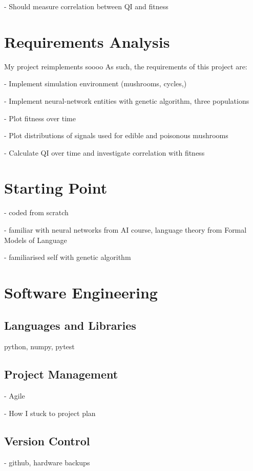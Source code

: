 \documentclass[12pt,a4paper,twoside,openright]{report}
\begin{document}
- Should measure correlation between QI and fitness

\section{Requirements Analysis}

My project reimplements \citet{Cangelosi1998} soooo
As such, the requirements of this project are:

- Implement simulation environment (mushrooms, cycles,)

- Implement neural-network entities with genetic algorithm, three populations

- Plot fitness over time

- Plot distributions of signals used for edible and poisonous mushrooms

- Calculate QI over time and investigate correlation with fitness 

\section{Starting Point}

- coded from scratch

- familiar with neural networks from AI course, language theory from Formal Models of Language

- familiarised self with genetic algorithm

\section{Software Engineering}

\subsection{Languages and Libraries}

python, numpy, pytest

\subsection{Project Management}

- Agile

- How I stuck to project plan

\subsection{Version Control}

- github, hardware backups
\end{document}
